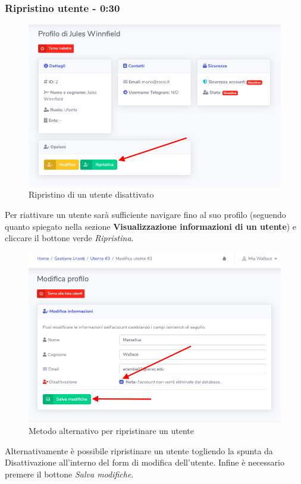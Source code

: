 	\subsubsection{Ripristino utente - 0:30}
		\begin{figure}[H]
		\centering
		\includegraphics[scale=0.600]{res/images/mod/ripristUtente.png}
		\caption{Ripristino di un utente disattivato}
	\end{figure}
	Per riattivare un utente sarà sufficiente navigare fino al suo profilo (seguendo quanto spiegato nella sezione \textbf{Visualizzazione informazioni di un utente}) e cliccare il bottone verde \textit{Ripristina}.
		\begin{figure}[H]
		\centering
		\includegraphics[scale=0.600]{res/images/mod/ripristUtente1.png}
		\caption{Metodo alternativo per ripristinare un utente}
	\end{figure}
	Alternativamente è possibile ripristinare un utente togliendo la spunta da Disattivazione all'interno del form di modifica dell'utente. Infine è necessario premere il bottone \textit{Salva modifiche}.


